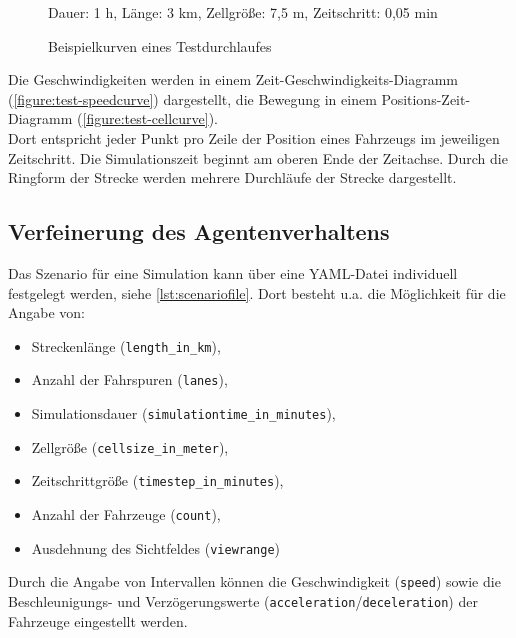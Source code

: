 \begin{figure}[hptb]
  \centering 
   \qquad
  \caption{Beispielkurven eines Testdurchlaufes}{\footnotesize Dauer: 1 h, Länge: 3 km, Zellgröße: 7,5 m, Zeitschritt: 0,05 min} 
  \label{figure:test-cell-speedcurves}
\end{figure}

Die Geschwindigkeiten werden in einem Zeit-Geschwindigkeits-Diagramm (\cref{figure:test-speedcurve}) dargestellt, die Bewegung in einem Positions-Zeit-Diagramm (\cref{figure:test-cellcurve}).
\\
Dort entspricht jeder Punkt pro Zeile der Position eines Fahrzeugs im jeweiligen Zeitschritt.
Die Simulationszeit beginnt am oberen Ende der Zeitachse.
Durch die Ringform der Strecke werden mehrere Durchläufe der Strecke dargestellt.






\subsection{Verfeinerung des Agentenverhaltens}
\label{sec:verfeinerung-agentenplan}

Das Szenario für eine Simulation kann über eine YAML-Datei individuell festgelegt werden, siehe \cref{lst:scenariofile}.
Dort besteht u.a. die Möglichkeit für die Angabe von:
\begin{itemize}
	\itemsep0em
	\item Streckenlänge (\texttt{length\_in\_km}), 
	\item Anzahl der Fahrspuren (\texttt{lanes}),
	\item Simulationsdauer (\texttt{simulationtime\_in\_minutes}), 
	\item Zellgröße (\texttt{cellsize\_in\_meter}), 
	\item Zeitschrittgröße (\texttt{timestep\_in\_minutes}), 
	\item Anzahl der Fahrzeuge (\texttt{count}), 
	\item Ausdehnung des Sichtfeldes (\texttt{viewrange}) 

\end{itemize}
Durch die Angabe von Intervallen können die Geschwindigkeit (\texttt{speed}) sowie die Beschleunigungs- und Verzögerungswerte (\texttt{acceleration}/\texttt{deceleration}) der Fahrzeuge eingestellt werden.



